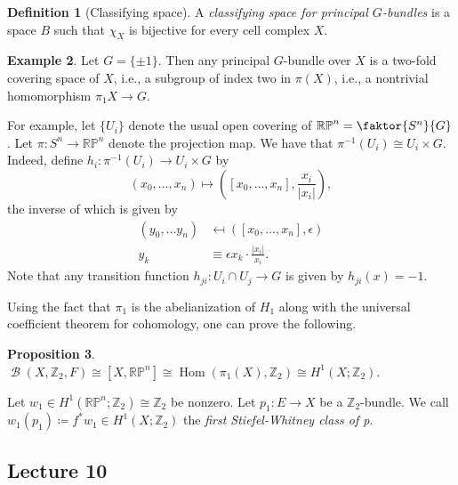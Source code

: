 \documentclass[10pt,letterpaper,cm]{nupset}
\theoremstyle{definition}
\newtheorem{defn}{Definition}[subsection]
\newtheorem{exmp}[defn]{Example}
\theoremstyle{theorem}
\newtheorem{prop}[defn]{Proposition}
\theoremstyle{remark}
\newcommand{\RP}{\mathbb{RP}}
\newcommand{\Z}{\mathbb Z}
\newcommand{\1}{\mathbb{1}}
\newcommand{\0}{\vec 0}
\DeclareMathOperator{\Hom}{Hom}
\DeclareMathOperator{\B}{\mathcal{B}}
\begin{document}
\begin{defn}[Classifying space]
  A \textit{classifying space for principal $G$-bundles} is a space $B$ such that $\chi_X$ is bijective for every cell complex $X$.
\end{defn}

\begin{exmp}
Let $G = \{\pm 1\}$.  Then any principal $G$-bundle over $X$ is a two-fold covering space of $X$, i.e., a subgroup of index two in $\pi\left(X\right)$, i.e., a nontrivial homomorphism $\pi_1{X} \to G$.

\smallskip

 For example, let $\{U_i\}$ denote the usual open covering of $\RP^n = \faktor{S^n}{G}$. Let $\pi : S^n \to \RP^n$ denote the projection map. We have that $\pi^{-1} \left(U_i\right) \cong U_i \times G$. Indeed,  define $h_i : \pi^{-1} \left(U_i\right) \to  U_i \times G$ by $$\left(x_0, \ldots, x_n\right) \mapsto \left(\left[x_0, \ldots, x_n\right], \frac{x_i}{\lvert{x_i}\rvert}\right),$$ the inverse of which is  given by 
 \begin{align*}
 \left(y_0, \ldots y_n\right) & \mapsfrom \left(\left[x_0, \ldots, x_n\right], \epsilon \right) 
 \\ y_k & \equiv \epsilon x_k\cdot \frac{\lvert{x_i}\rvert}{x_i}.
 \end{align*}
 Note that any transition function $h_{ji} : U_i \cap U_j \to G$ is given by $h_{ji}(x) = {-}1$.
\end{exmp}

Using the fact that $\pi_1$ is the abelianization of $H_1$ along with the universal coefficient theorem for cohomology, one can prove the following.

\begin{prop}
$\B\left(X, \Z_2, F \right) \cong \left[X, \RP^n\right] \cong \Hom\left(\pi_1\left(X\right), \Z_2\right) \cong H^1\left(X; \Z_2\right)$. 
\end{prop}

Let $w_1 \in H^1\left(\RP^n; \Z_2\right) \cong \Z_2$ be nonzero. Let $p_1 : E \to X$ be a $\Z_2$-bundle. We call $w_1\left(p_1\right) \coloneqq f^{\ast}{w_1} \in H^1\left(X; \Z_2\right)$ the \textit{first Stiefel-Whitney class of p}. 

\subsection{Lecture 10}
\end{document}

